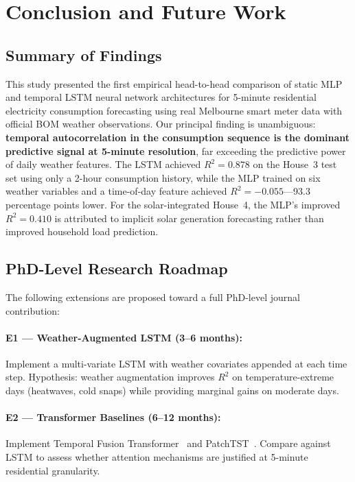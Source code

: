 \documentclass[12pt,a4paper]{article}
\begin{document}
\section{Conclusion and Future Work}
\label{sec:conclusion}

\subsection{Summary of Findings}

This study presented the first empirical head-to-head comparison of static MLP
and temporal LSTM neural network architectures for 5-minute residential
electricity consumption forecasting using real Melbourne smart meter data with
official BOM weather observations. Our principal finding is unambiguous:
\textbf{temporal autocorrelation in the consumption sequence is the dominant
predictive signal at 5-minute resolution}, far exceeding the predictive power
of daily weather features. The LSTM achieved $R^2 = 0.878$ on the House~3 test
set using only a 2-hour consumption history, while the MLP trained on six
weather variables and a time-of-day feature achieved $R^2 = -0.055$---93.3
percentage points lower. For the solar-integrated House~4, the MLP's improved
$R^2 = 0.410$ is attributed to implicit solar generation forecasting rather
than improved household load prediction.

\subsection{PhD-Level Research Roadmap}

The following extensions are proposed toward a full PhD-level journal
contribution:

\paragraph{E1 --- Weather-Augmented LSTM (3--6 months):}
Implement a multi-variate LSTM with weather covariates appended at each time
step. Hypothesis: weather augmentation improves $R^2$ on temperature-extreme
days (heatwaves, cold snaps) while providing marginal gains on moderate days.

\paragraph{E2 --- Transformer Baselines (6--12 months):}
Implement Temporal Fusion Transformer~\cite{lim2021} and
PatchTST~\cite{nie2023}. Compare against LSTM to assess whether attention
mechanisms are justified at 5-minute residential granularity.
\end{document}
